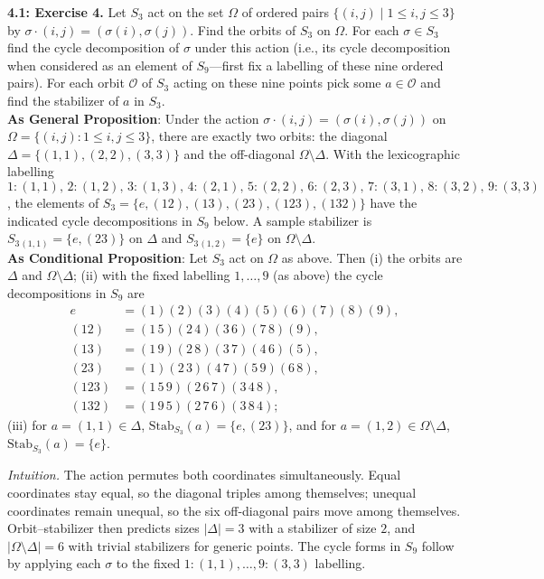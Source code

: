 \documentclass[11pt]{article}
\theoremstyle{definition}
\begin{document}
\newpage

\newpage

\noindent \textbf{4.1: Exercise 4.} Let $S_3$ act on the set $\Omega$ of ordered pairs $\{(i,j)\mid 1\le i,j\le 3\}$ by $\sigma\!\cdot\!(i,j)=(\sigma(i),\sigma(j))$. Find the orbits of $S_3$ on $\Omega$. For each $\sigma\in S_3$ find the cycle decomposition of $\sigma$ under this action (i.e., its cycle decomposition when considered as an element of $S_9$—first fix a labelling of these nine ordered pairs). For each orbit $\mathcal O$ of $S_3$ acting on these nine points pick some $a\in\mathcal O$ and find the stabilizer of $a$ in $S_3$.\\ %

\noindent\textbf{As General Proposition}: Under the action $\sigma\!\cdot\!(i,j)=(\sigma(i),\sigma(j))$ on $\Omega=\{(i,j):1\le i,j\le 3\}$, there are exactly two orbits: the diagonal $\Delta=\{(1,1),(2,2),(3,3)\}$ and the off-diagonal $\Omega\setminus\Delta$. With the lexicographic labelling $1:(1,1),\,2:(1,2),\,3:(1,3),\,4:(2,1),\,5:(2,2),\,6:(2,3),\,7:(3,1),\,8:(3,2),\,9:(3,3)$, the elements of $S_3=\{e,(12),(13),(23),(123),(132)\}$ have the indicated cycle decompositions in $S_9$ below. A sample stabilizer is $S_3{}_{(1,1)}=\{e,(23)\}$ on $\Delta$ and $S_3{}_{(1,2)}=\{e\}$ on $\Omega\setminus\Delta$.\\

\noindent \textbf{As Conditional Proposition}: Let $S_3$ act on $\Omega$ as above. Then (i) the orbits are $\Delta$ and $\Omega\setminus\Delta$; (ii) with the fixed labelling $1,\dots,9$ (as above) the cycle decompositions in $S_9$ are
\[
\begin{aligned}
e&=(1)(2)(3)(4)(5)(6)(7)(8)(9),\\
(12)&=(1\,5)(2\,4)(3\,6)(7\,8)(9),\\
(13)&=(1\,9)(2\,8)(3\,7)(4\,6)(5),\\
(23)&=(1)(2\,3)(4\,7)(5\,9)(6\,8),\\
(123)&=(1\,5\,9)(2\,6\,7)(3\,4\,8),\\
(132)&=(1\,9\,5)(2\,7\,6)(3\,8\,4);
\end{aligned}
\]
(iii) for $a=(1,1)\in\Delta$, $\mathrm{Stab}_{S_3}(a)=\{e,(23)\}$, and for $a=(1,2)\in\Omega\setminus\Delta$, $\mathrm{Stab}_{S_3}(a)=\{e\}$.\\

\newpage

\dotfill

\emph{Intuition.} The action permutes both coordinates simultaneously. Equal coordinates stay equal, so the diagonal triples among themselves; unequal coordinates remain unequal, so the six off-diagonal pairs move among themselves. Orbit–stabilizer then predicts sizes $|\Delta|=3$ with a stabilizer of size $2$, and $|\Omega\setminus\Delta|=6$ with trivial stabilizers for generic points. The cycle forms in $S_9$ follow by applying each $\sigma$ to the fixed $1\!:\!(1,1),\dots,9\!:\!(3,3)$ labelling.\\
\end{document}
